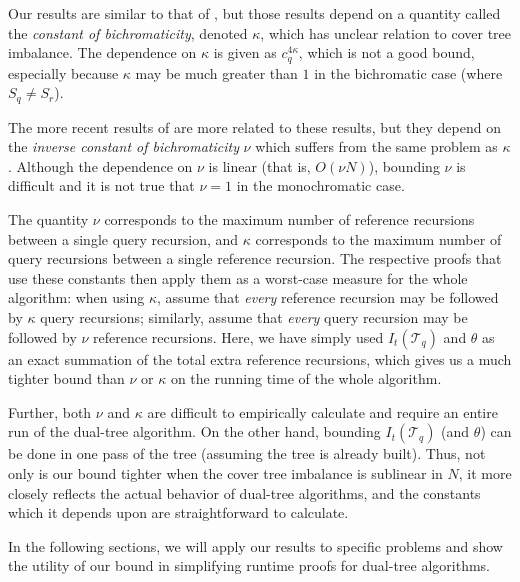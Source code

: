 Our results are similar to that of \citet{ram2009}, but those results depend on
a quantity called the {\it constant of bichromaticity}, denoted $\kappa$, which
has unclear relation to cover tree imbalance.  The dependence on $\kappa$ is
given as $c_q^{4 \kappa}$, which is not a good bound, especially because
$\kappa$ may be much greater than $1$ in the bichromatic case (where $S_q \ne
S_r$).

The more recent results of \citet{curtin2014dual} are more related to these
results, but they depend on the {\it inverse constant of bichromaticity} $\nu$
which suffers from the same problem as $\kappa$.  Although the dependence on
$\nu$ is linear (that is, $O(\nu N)$), bounding $\nu$ is difficult and it is not
true that $\nu = 1$ in the monochromatic case.

The quantity $\nu$ corresponds to the maximum number of reference recursions
between a single query recursion, and $\kappa$ corresponds to the maximum number
of query recursions between a single reference recursion.  The respective proofs
that use these constants then apply them as a worst-case measure for the whole
algorithm: when using $\kappa$, \citet{ram2009} assume that {\it every}
reference recursion may be followed by $\kappa$ query recursions; similarly,
\citet{curtin2014dual} assume that {\it every} query recursion may be followed
by $\nu$ reference recursions.  Here, we have simply used $I_t(\mathscr{T}_q)$
and $\theta$ as an exact summation of the total extra reference recursions,
which gives us a much tighter bound than $\nu$ or $\kappa$ on the running time
of the whole algorithm.

Further, both $\nu$ and $\kappa$ are difficult to empirically calculate and
require an entire run of the dual-tree algorithm.  On the other hand, bounding
$I_t(\mathscr{T}_q)$ (and $\theta$) can be done in one pass of the tree
(assuming the tree is already built).  Thus, not only is our bound tighter when
the cover tree imbalance is sublinear in $N$, it more closely reflects the
actual behavior of dual-tree algorithms, and the constants which it depends upon
are straightforward to calculate.

In the following sections, we will apply our results to specific problems and
show the utility of our bound in simplifying runtime proofs for dual-tree
algorithms.



